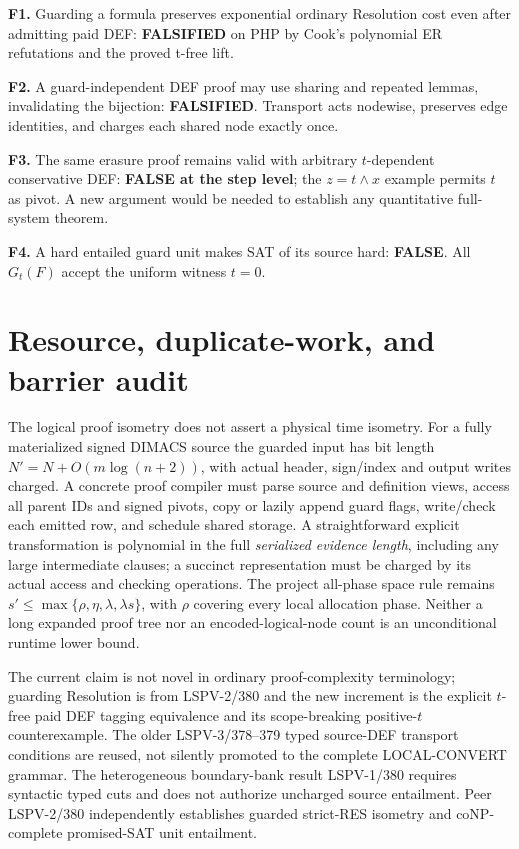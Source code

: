 \documentclass[11pt]{article}
\begin{document}
\noindent\textbf{F1.} Guarding a formula preserves exponential ordinary
Resolution cost even after admitting paid DEF:
\textbf{FALSIFIED} on PHP by Cook's polynomial ER refutations
and the proved t-free lift.

\noindent\textbf{F2.} A guard-independent DEF proof may use sharing
and repeated lemmas, invalidating the bijection:
\textbf{FALSIFIED}. Transport acts nodewise, preserves edge
identities, and charges each shared node exactly once.

\noindent\textbf{F3.} The same erasure proof remains valid with
arbitrary $t$-dependent conservative DEF:
\textbf{FALSE at the step level}; the $z=t\wedge x$
example permits $t$ as pivot. A new argument would be needed
to establish any quantitative full-system theorem.

\noindent\textbf{F4.} A hard entailed guard unit makes SAT of its
source hard: \textbf{FALSE}. All $G_t(F)$ accept the uniform witness $t=0$.

\section*{Resource, duplicate-work, and barrier audit}
The logical proof isometry does not assert a physical time isometry.
For a fully materialized signed DIMACS source the guarded input
has bit length $N'=N+O(m\log(n+2))$, with actual header,
sign/index and output writes charged. A concrete proof
compiler must parse source and definition views, access all
parent IDs and signed pivots, copy or lazily append guard flags,
write/check each emitted row, and schedule shared storage.
A straightforward explicit transformation is polynomial in
the full \emph{serialized evidence length}, including any
large intermediate clauses; a succinct representation must be
charged by its actual access and checking operations. The project
all-phase space rule remains
$s'\le\max\{\rho,\eta,\lambda,\lambda s\}$, with $\rho$
covering every local allocation phase. Neither a long expanded
proof tree nor an encoded-logical-node count is an unconditional
runtime lower bound.

The current claim is not novel in ordinary proof-complexity
terminology; guarding Resolution is from LSPV-2/380
and the new increment is the explicit $t$-free paid DEF
tagging equivalence and its scope-breaking positive-$t$
counterexample. The older LSPV-3/378--379 typed source-DEF
transport conditions are reused, not silently promoted to
the complete LOCAL-CONVERT grammar. The heterogeneous
boundary-bank result LSPV-1/380 requires syntactic
typed cuts and does not authorize uncharged source entailment.
Peer LSPV-2/380 independently establishes guarded strict-RES
isometry and coNP-complete promised-SAT unit entailment.
\end{document}
